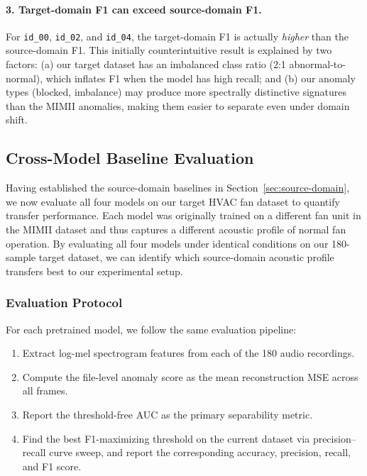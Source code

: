 \documentclass[12pt, a4paper]{article}
\begin{document}
\paragraph{3. Target-domain F1 can exceed source-domain F1.}
For \texttt{id\_00}, \texttt{id\_02}, and \texttt{id\_04}, the target-domain F1 is actually \emph{higher} than the source-domain F1. This initially counterintuitive result is explained by two factors: (a) our target dataset has an imbalanced class ratio (2:1 abnormal-to-normal), which inflates F1 when the model has high recall; and (b) our anomaly types (blocked, imbalance) may produce more spectrally distinctive signatures than the MIMII anomalies, making them easier to separate even under domain shift.


\subsection{Cross-Model Baseline Evaluation}
\label{sec:cross-model-eval}

Having established the source-domain baselines in Section~\ref{sec:source-domain}, we now evaluate all four models on our target HVAC fan dataset to quantify transfer performance. Each model was originally trained on a different fan unit in the MIMII dataset and thus captures a different acoustic profile of normal fan operation. By evaluating all four models under identical conditions on our 180-sample target dataset, we can identify which source-domain acoustic profile transfers best to our experimental setup.

\subsubsection{Evaluation Protocol}

For each pretrained model, we follow the same evaluation pipeline:
\begin{enumerate}
    \item Extract log-mel spectrogram features from each of the 180 audio recordings.
    \item Compute the file-level anomaly score as the mean reconstruction MSE across all frames.
    \item Report the threshold-free AUC as the primary separability metric.
    \item Find the best F1-maximizing threshold on the current dataset via precision--recall curve sweep, and report the corresponding accuracy, precision, recall, and F1 score.
\end{enumerate}
\end{document}
